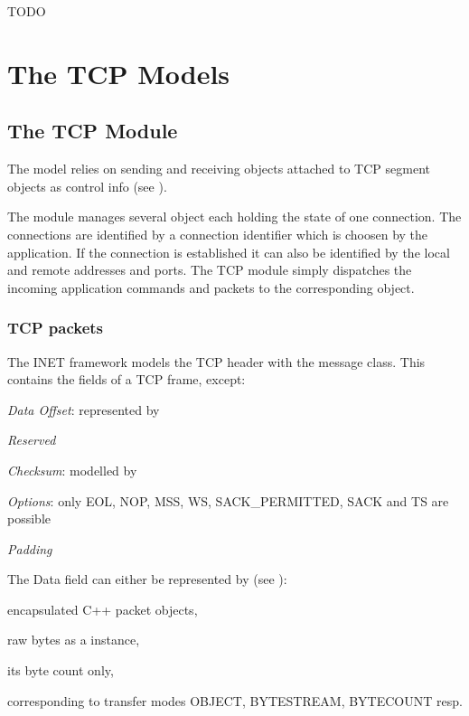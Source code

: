 \ifdraft TODO

\chapter{The TCP Models}
\label{cha:tcp}

\section{The TCP Module}

The  model relies on sending and receiving  objects
attached to TCP segment objects as control info (see ).

The  module manages several  object each
holding the state of one connection. The connections are identified
by a connection identifier which is choosen by the application.
If the connection is established it can also be identified by
the local and remote addresses and ports. The TCP module simply
dispatches the incoming application commands and packets to
the corresponding object.

\subsection{TCP packets}
\label{subsec:tcp_packets}

The INET framework models the TCP header with the  message class.
This contains the fields of a TCP frame, except:
\begin{compactitem}
  \item \emph{Data Offset}: represented by 
  \item \emph{Reserved}
  \item \emph{Checksum}: modelled by 
  \item \emph{Options}: only EOL, NOP, MSS, WS, SACK\_PERMITTED, SACK and TS are possible
  \item \emph{Padding}
\end{compactitem}

The Data field can either be represented by (see ):
\begin{compactitem}
  \item encapsulated C++ packet objects,
  \item raw bytes as a  instance,
  \item its byte count only,
\end{compactitem}
corresponding to transfer modes OBJECT, BYTESTREAM, BYTECOUNT resp.


